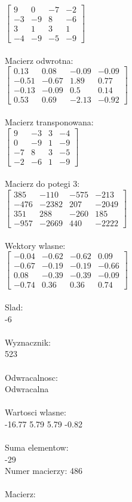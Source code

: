 \documentclass[a4paper,12pt]{article}
\begin{document}
$\begin{bmatrix} 9&0&-7&-2\\-3&-9&8&-6\\3&1&3&1\\-4&-9&-5&-9 \end{bmatrix}$
\\
\\
Macierz odwrotna:\\

$\begin{bmatrix} 0.13&0.08&-0.09&-0.09\\-0.51&-0.67&1.89&0.77\\-0.13&-0.09&0.5&0.14\\0.53&0.69&-2.13&-0.92 \end{bmatrix}$
\\
\\
Macierz transponowana:\\

$\begin{bmatrix} 9&-3&3&-4\\0&-9&1&-9\\-7&8&3&-5\\-2&-6&1&-9 \end{bmatrix}$
\\
\\
Macierz do potegi 3:\\

$\begin{bmatrix} 385&-110&-575&-213\\-476&-2382&207&-2049\\351&288&-260&185\\-957&-2669&440&-2222 \end{bmatrix}$
\\
\\
Wektory wlasne:\\

$\begin{bmatrix} -0.04&-0.62&-0.62&0.09\\-0.67&-0.19&-0.19&-0.66\\0.08&-0.39&-0.39&-0.09\\-0.74&0.36&0.36&0.74 \end{bmatrix}$
\\
\\
Slad:\\
-6
\\
\\
Wyznacznik:\\
523
\\
\\
Odwracalnosc:\\
Odwracalna
\\
\\
Wartosci wlasne:\\
-16.77 5.79 5.79 -0.82
\\
\\
Suma elementow:\\
-29
\\
\newpage
Numer macierzy:
486
\\
\\
Macierz:\\
\end{document}
